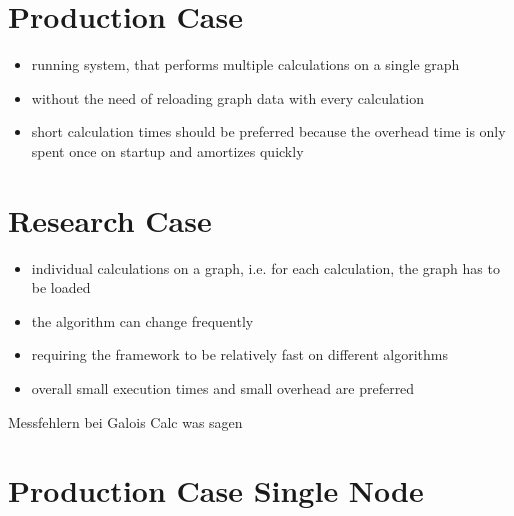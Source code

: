 \documentclass{meetings}
\begin{document}
\clearpage
\begin{multicols}{2}
\section{Production Case}
\begin{itemize}
	\item running system, that performs multiple calculations on a single graph
	\item without the need of reloading graph data with every calculation
	\item short calculation times should be preferred because the overhead time is only spent once on startup and amortizes quickly
\end{itemize}

\columnbreak
\section{Research Case}
\begin{itemize}
	\item individual calculations on a graph, i.e. for each calculation, the graph has to be loaded
	\item the algorithm can change frequently
	\item requiring the framework to be relatively fast on different algorithms
	\item overall small execution times and small overhead are preferred
\end{itemize}
\end{multicols}

Messfehlern bei Galois Calc was sagen

\clearpage
\section{Production Case Single Node}
\end{document}
